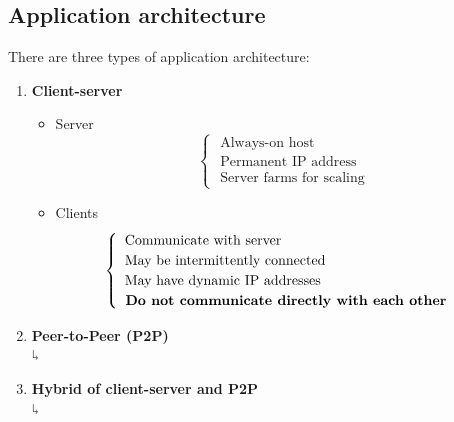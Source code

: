 \subsection{Application architecture}
There are three types of application architecture:
\begin{enumerate}
	\item \textbf{Client-server}
	\begin{itemize}
	\item Server
		\begin{equation}
		\begin{cases}
		\text{ Always-on host}\\
        \text{ Permanent IP address}\\
		\text{ Server farms for scaling}
		\end{cases}
		\end{equation}
	\item Clients
		\begin{equation}
		\begin{cases}
		\text{ Communicate with server}\\
		\text{ May be intermittently connected}\\
		\text{ May have dynamic IP addresses}\\
		\text{\textbf{ Do not communicate directly with each other}}
		\end{cases}
		\end{equation}
	\end{itemize}
	\item \textbf{Peer-to-Peer (P2P)}\\ $\rotatebox[origin=c]{180}{$\Lsh$}$
\item \textbf{Hybrid of client-server and P2P}\\ $\rotatebox[origin=c]{180}{$\Lsh$}$
\end{enumerate}













